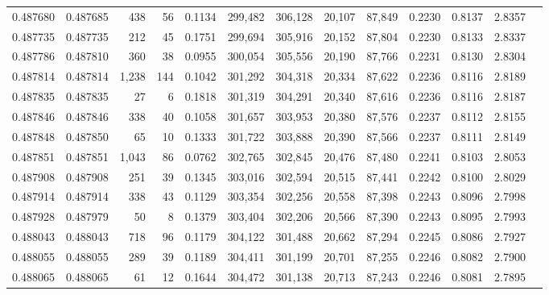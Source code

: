 \begin{tabular}{rrrrrrrrrrrrr}
0.487680 & 0.487685 &   438 &    56 &                                     0.1134 & 299,482 & 306,128 &  20,107 &  87,849 & 0.2230 & 0.8137 & 2.8357 \\
0.487735 & 0.487735 &   212 &    45 &                                     0.1751 & 299,694 & 305,916 &  20,152 &  87,804 & 0.2230 & 0.8133 & 2.8337 \\
0.487786 & 0.487810 &   360 &    38 &                                     0.0955 & 300,054 & 305,556 &  20,190 &  87,766 & 0.2231 & 0.8130 & 2.8304 \\
0.487814 & 0.487814 & 1,238 &   144 &                                     0.1042 & 301,292 & 304,318 &  20,334 &  87,622 & 0.2236 & 0.8116 & 2.8189 \\
0.487835 & 0.487835 &    27 &     6 &                                     0.1818 & 301,319 & 304,291 &  20,340 &  87,616 & 0.2236 & 0.8116 & 2.8187 \\
0.487846 & 0.487846 &   338 &    40 &                                     0.1058 & 301,657 & 303,953 &  20,380 &  87,576 & 0.2237 & 0.8112 & 2.8155 \\
0.487848 & 0.487850 &    65 &    10 &                                     0.1333 & 301,722 & 303,888 &  20,390 &  87,566 & 0.2237 & 0.8111 & 2.8149 \\
0.487851 & 0.487851 & 1,043 &    86 &                                     0.0762 & 302,765 & 302,845 &  20,476 &  87,480 & 0.2241 & 0.8103 & 2.8053 \\
0.487908 & 0.487908 &   251 &    39 &                                     0.1345 & 303,016 & 302,594 &  20,515 &  87,441 & 0.2242 & 0.8100 & 2.8029 \\
0.487914 & 0.487914 &   338 &    43 &                                     0.1129 & 303,354 & 302,256 &  20,558 &  87,398 & 0.2243 & 0.8096 & 2.7998 \\
0.487928 & 0.487979 &    50 &     8 &                                     0.1379 & 303,404 & 302,206 &  20,566 &  87,390 & 0.2243 & 0.8095 & 2.7993 \\
0.488043 & 0.488043 &   718 &    96 &                                     0.1179 & 304,122 & 301,488 &  20,662 &  87,294 & 0.2245 & 0.8086 & 2.7927 \\
0.488055 & 0.488055 &   289 &    39 &                                     0.1189 & 304,411 & 301,199 &  20,701 &  87,255 & 0.2246 & 0.8082 & 2.7900 \\
0.488065 & 0.488065 &    61 &    12 &                                     0.1644 & 304,472 & 301,138 &  20,713 &  87,243 & 0.2246 & 0.8081 & 2.7895 \\

\end{tabular}
